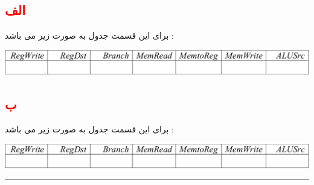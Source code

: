 \subsection*{\textcolor{red}{الف}}
برای این قسمت جدول به صورت زیر می باشد   : 
\begin{center}
	\includegraphics[width=1\textwidth]{beq}
\end{center}
\subsection*{\textcolor{red}{ب}}
برای این قسمت جدول به صورت زیر می باشد   :
\begin{center}
	\includegraphics[width=1\textwidth]{beq}
\end{center}
\hrule
